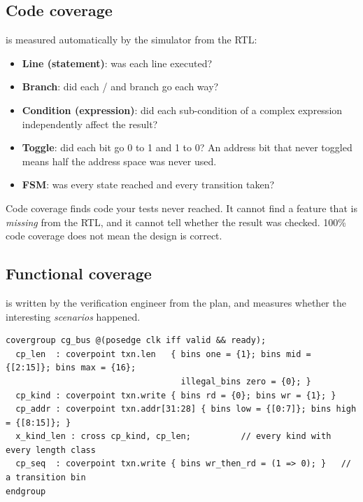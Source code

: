 \subsection*{Code coverage}

 is measured automatically by the simulator from the RTL:
\begin{itemize}
  \item \textbf{Line (statement)}: was each line executed?
  \item \textbf{Branch}: did each / and  branch go each way?
  \item \textbf{Condition (expression)}: did each sub-condition of a complex expression independently affect the result?
  \item \textbf{Toggle}: did each bit go 0 to 1 and 1 to 0? An address bit that never toggled means half the address space was never used.
  \item \textbf{FSM}: was every state reached and every transition taken?
\end{itemize}

Code coverage finds code your tests never reached. It cannot find a feature that is \emph{missing} from the RTL, and it cannot tell whether the result was checked. 100\% code coverage does not mean the design is correct.

\subsection*{Functional coverage}

 is written by the verification engineer from the plan, and measures whether the interesting \emph{scenarios} happened.

\begin{lstlisting}
covergroup cg_bus @(posedge clk iff valid && ready);
  cp_len  : coverpoint txn.len   { bins one = {1}; bins mid = {[2:15]}; bins max = {16};
                                   illegal_bins zero = {0}; }
  cp_kind : coverpoint txn.write { bins rd = {0}; bins wr = {1}; }
  cp_addr : coverpoint txn.addr[31:28] { bins low = {[0:7]}; bins high = {[8:15]}; }
  x_kind_len : cross cp_kind, cp_len;          // every kind with every length class
  cp_seq  : coverpoint txn.write { bins wr_then_rd = (1 => 0); }   // a transition bin
endgroup
\end{lstlisting}

